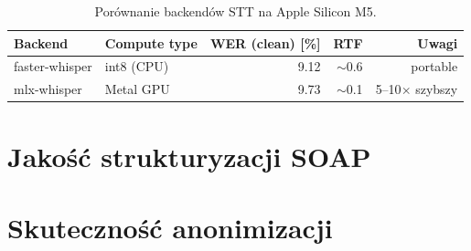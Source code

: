 
\begin{table}[htbp]
  \centering
  \caption{Porównanie backendów STT na Apple Silicon M5.}
  \label{tab:stt-backends}
  \begin{tabular}{llrrr}
    \toprule
    Backend & Compute type & WER (clean) [\%] & RTF & Uwagi \\
    \midrule
    faster-whisper & int8 (CPU) & 9.12 & $\sim$0.6 & portable \\
    mlx-whisper & Metal GPU & 9.73 & $\sim$0.1 & 5–10$\times$ szybszy \\
    \bottomrule
  \end{tabular}
\end{table}


\section{Jakość strukturyzacji SOAP}\label{sec:ewaluacja-slm}

%

\section{Skuteczność anonimizacji}\label{sec:ewaluacja-anonimizacja}

%


